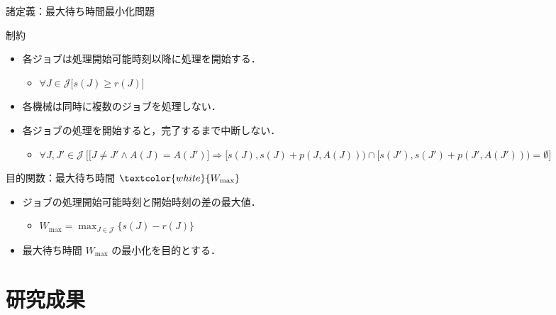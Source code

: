 \documentclass[dvipdfmx]{beamer}
\begin{document}
    \begin{frame}{諸定義：最大待ち時間最小化問題}
      \begin{block}{制約}
        \begin{itemize}
          \item 各ジョブは処理開始可能時刻以降に処理を開始する．
          \begin{itemize}
            \item $\forall J \in \mathcal{J}\big[s(J) \ge r(J) \big]$
          \end{itemize}
          \item 各機械は同時に複数のジョブを処理しない．
          \item 各ジョブの処理を開始すると，完了するまで中断しない．
          \begin{itemize}
            \item {$\forall J, J' \in \mathcal{J}\ \Big[ \big[J\ne J' \land A(J) = A(J')\big] \Rightarrow [s(J), s(J)+p(J,A(J))) \cap[s(J'), s(J')+p(J', A(J'))) = \emptyset \Big]$}
          \end{itemize}
        \end{itemize}
      \end{block}
      \begin{block}{目的関数：最大待ち時間 $\textcolor{white}{W_{\max}}$}
        \begin{itemize}
          \item ジョブの処理開始可能時刻と開始時刻の差の最大値．
          \begin{itemize}
            \item $W_{\max} = {\displaystyle \max_{J \in \mathcal{J}}\{s(J) - r(J)\}}$
          \end{itemize}
        \end{itemize}
      \end{block}
      \begin{itemize}
        \item 最大待ち時間 $W_{\max}$ の最小化を目的とする．
      \end{itemize}
    \end{frame}

    \section{研究成果}
\end{document}
